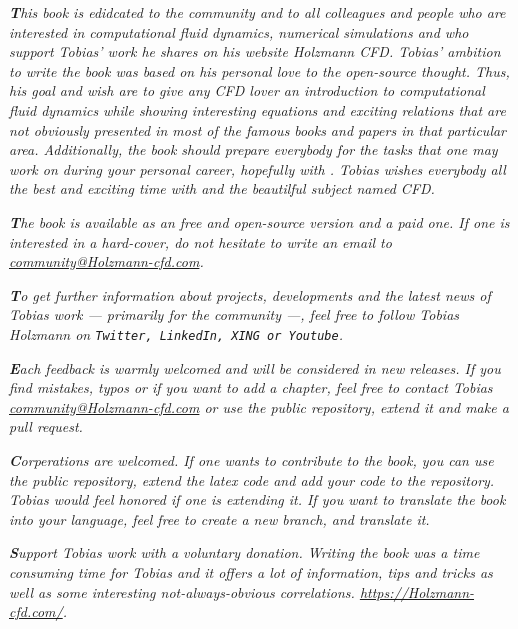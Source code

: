 %
%
\newpage
%
%
\textit{
    \textbf{T}his book is edidcated to the \OF community and to all colleagues
    and people who are interested in computational fluid dynamics, numerical
    simulations and who support Tobias' work he shares on his website Holzmann
    CFD. Tobias' ambition to write the book was based on his personal love to
    the open-source thought. Thus, his goal and wish are to give any CFD lover
    an introduction to computational fluid dynamics while showing interesting
    equations and exciting relations that are not obviously presented in most
    of the famous books and papers in that particular area. Additionally, the
    book should prepare everybody for the tasks that one may work on during
    your personal career, hopefully with \OF. Tobias wishes everybody all the
    best and exciting time with \OF and the beautilful subject named CFD.
}

%
%
\vspace{20pt}
%
%
\textit{
    \textbf{T}he book is available as an free and open-source version and a paid
    one. If one is interested in a hard-cover, do not hesitate to write an email
    to \href{mailto:community@Holzmann-cfd.com}{\color{myCiteColor}community@Holzmann-cfd.com}.
}

%
%
\vspace{20pt}
%
%
\textit{
    \textbf{T}o get further information about projects, developments and the
    latest news of Tobias work --- primarily for the community ---, feel free to
    follow Tobias Holzmann on \texttt{Twitter, LinkedIn, XING or Youtube}.
}

%
%
\vspace{20pt}
%
%
\textit{
    \textbf{E}ach feedback is warmly welcomed and will be considered in new
    releases. If you find mistakes, typos or if you want to add a chapter,
    feel free to contact Tobias \href{mailto:community@Holzmann-cfd.com}{\color{myCiteColor}community@Holzmann-cfd.com}
    or use the public repository, extend it and make a pull request.
}

%
%
\vspace{20pt}
%
%
\textit{
    \textbf{C}orperations are welcomed. If one wants to contribute to the book,
    you can use the public repository, extend the latex code and add your
    code to the repository. Tobias would feel honored if one is extending it.
    If you want to translate the book into your language, feel free to create
    a new branch, and translate it.
}

%
%
\vspace{20pt}
%
%
\textit{
    \textbf{S}upport Tobias work with a voluntary donation. Writing the book
    was a time consuming time for Tobias and it offers a lot of information,
    tips and tricks as well as some interesting not-always-obvious correlations.
    \url{https://Holzmann-cfd.com/}.
}

%
%
\newpage


